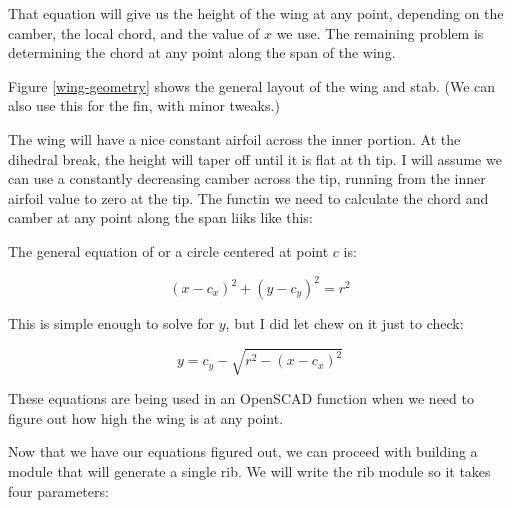 That equation will give us the height of the wing at any point, depending on
the camber, the local chord, and the value of {$x$} we use. The remaining
problem is determining the chord at any point along the span of the wing.

Figure \ref{wing-geometry} shows the general layout of the wing and stab. (We
can also use this for the fin, with minor tweaks.)


The wing will have a nice constant airfoil across the inner portion. At the dihedral break, the height will taper off until it is flat at th tip. I will assume we can use a constantly decreasing camber across the tip, running from the inner airfoil value to zero at the tip. The functin we need to calculate the chord and camber at any point along the span liiks like this:

The general equation of or a circle centered at point {$c$} is:

\begin{equation}
  {(x - c_x)}^2 + {(y - c_y)}^2 = r^2
\end{equation}

This is simple enough to solve for {$y$}, but I did let {\sympy} chew on it just to check:

\begin{equation}
  y = c_y - \sqrt{r^2 - (x - c_x)^{2}}
\end{equation}

These equations are being used in an OpenSCAD function when we need to figure out how high the wing is at any point.






Now that we have our equations figured out, we can proceed with building a
module that will generate a single rib. We will write the rib module so it
takes four parameters:

